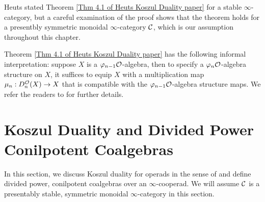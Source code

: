 \begin{remark}
Heuts stated Theorem \ref{Thm 4.1 of Heuts Koszul Duality paper} for a stable $\infty$-category, but a careful examination of the proof shows that the theorem holds for a presentbly symmetric monoidal $\infty$-category ${\mathcal{C}}$, which is our assumption throughout this chapter.
\end{remark}

\begin{remark}
Theorem \ref{Thm 4.1 of Heuts Koszul Duality paper} has the following informal interpretation: suppose $X$ is a $\varphi_{n-1}{\mathcal{O}}$-algebra, then to specify a $\varphi_n{\mathcal{O}}$-algebra structure on $X$, it suffices to equip $X$ with a multiplication map $\mu_n: D^{{\mathcal{O}}}_n(X)\to X$ that is compatible with the $\varphi_{n-1}{\mathcal{O}}$-algebra structure maps. We refer the readers to \cite{Heuts_Koszul} for further details.
\end{remark}





\section{Koszul Duality and Divided Power Conilpotent  Coalgebras }
\label{Coalgebras over cooperads and Koszul Duality}
In this section, we discuss Koszul duality for operads in the sense of \cite{Ginzburg-Kapranov} and define divided power, conilpotent coalgebras over an $\infty$-cooperad. 
We will assume ${\mathcal{C}}$ is a presentably stable, symmetric monoidal $\infty$-category in this section.


